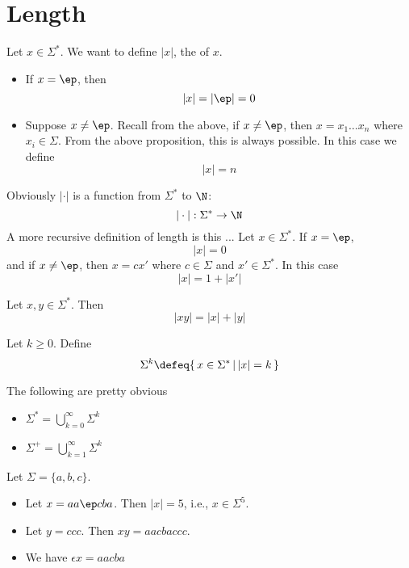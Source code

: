 \section{Length}

\begin{defn} Let $x \in \Sigma^*$. We want to define $|x|$, the
 of $x$.
 \begin{itemize}
 \item If $x = \ep$, then
  \[
   |x| = |\ep| = 0
  \]
 \item Suppose $x \neq \ep$. Recall from the above, if $x \neq \ep$, then
  $x = x_1 \ldots x_n$ where $x_i \in \Sigma$. From the above
  proposition, this is always possible. In this case we define
  \[
   |x| = n
  \]
 \end{itemize}
 Obviously $|\cdot|$ is a function from $\Sigma^*$ to $\N$:
 \[
 |\cdot| : \Sigma^* \rightarrow \N
 \]
A more recursive definition of length is this ...
Let $x \in \Sigma^*$. If $x = \ep$,
\[
|x| = 0
\]
and if $x \neq \ep$, then $x = cx'$ where $c \in \Sigma$ and
$x' \in \Sigma^*$. In this case
\[
|x| = 1 + |x'|
\]
\end{defn}

\begin{prop}
Let $x,y \in \Sigma^*$. Then
\[ |xy| = |x| + |y| \]
\end{prop}

\begin{defn}
Let $k \geq 0$. Define
\[
 \Sigma^k \defeq \{\, x \in \Sigma^* \,|\, |x| = k \,\}
\]
\end{defn}

\begin{prop} The following are pretty obvious
 \begin{itemize}
  \item $\Sigma^* = \bigcup^\infty_{k=0} \Sigma^k$
  \item $\Sigma^+ = \bigcup^\infty_{k=1} \Sigma^k$
 \end{itemize}
\end{prop}

\newpage
\begin{eg}
 Let $\Sigma = \{a,b,c\}$.
 \begin{itemize}
  \item Let $x = aa\ep cba$. Then $|x| = 5$, i.e., $x \in \Sigma^5$.
  \item Let $y = ccc$. Then $xy = aacbaccc$.
  \item We have $\epsilon x = aacba$
 \end{itemize}
\end{eg}


